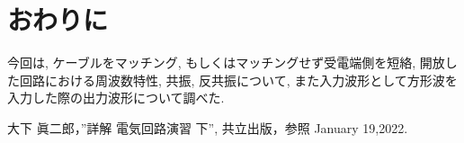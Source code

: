\documentclass[a4j,12pt,]{jarticle}
\begin{document}
\section{おわりに}

今回は, ケーブルをマッチング, もしくはマッチングせず受電端側を短絡, 開放した回路における周波数特性, 共振, 反共振について, また入力波形として方形波を入力した際の出力波形について調べた.

\begin{thebibliography}{5}
  大下 眞二郎，”詳解 電気回路演習 下”, 共立出版，参照 January 19,2022.
\end{thebibliography}
\end{document}
